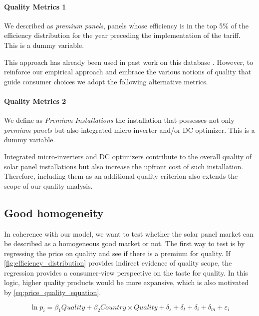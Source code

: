 \paragraph{Quality Metrics 1} We described as \textit{premium panels}, panels whose efficiency is in the top 5\% of the efficiency distribution for the year preceding the implementation of the tariff. This is a dummy variable.

\vspace{1em}
This approach has already been used in past work on this database \citep{nemetWhatFactorsAffect2016, oshaughnessyNonmonotonicEffectsMarket2019}. However, to reinforce our empirical approach and embrace the various notions of quality that guide consumer choices we adopt the following alternative metrics. 

\paragraph{Quality Metrics 2} We define as \textit{Premium Installations} the installation that possesses not only \textit{premium panels} but also integrated micro-inverter and/or DC optimizer. This is a dummy variable.

\vspace{1em}
Integrated micro-inverters and DC optimizers contribute to the overall quality of solar panel installations but also increase the upfront cost of such installation. Therefore, including them as an additional quality criterion also extends the scope of our quality analysis.


\subsection{Good homogeneity}

In coherence with our model, we want to test whether the solar panel market can be described as a homogeneous good market or not. The first way to test is by regressing the price on quality and see if there is a premium for quality. If \autoref{fig:efficiency_distribution} provides indirect evidence of quality scope, the regression provides a consumer-view perspective on the taste for quality. In this logic, higher quality products would be more expansive, which is also motivated by \eqref{eq:price_quality_equation}. 

\begin{equation}
    \ln p_{i} = \beta_1Quality + \beta_2 Country \times Quality+\delta_s + \delta_t + \delta_i + \delta_m + \varepsilon_i 
\end{equation}

